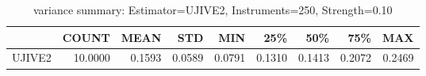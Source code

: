 \begin{table}[ht]
\centering
\caption{variance summary: Estimator=UJIVE2, Instruments=250, Strength=0.10}
\begin{tabular}{lrrrrrrrr}
\toprule
 & COUNT & MEAN & STD & MIN & 25\% & 50\% & 75\% & MAX \\
\midrule
UJIVE2 & 10.0000 & 0.1593 & 0.0589 & 0.0791 & 0.1310 & 0.1413 & 0.2072 & 0.2469 \\
\bottomrule
\end{tabular}
\end{table}

